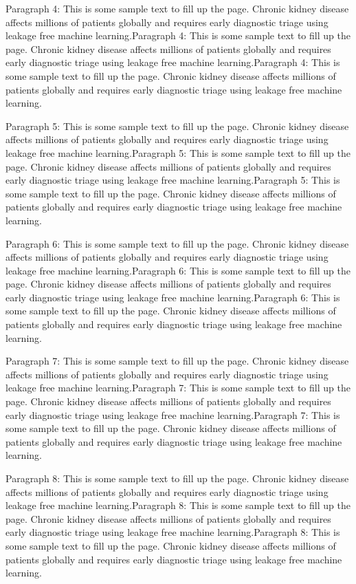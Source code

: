 \documentclass{IEEEtran}
\begin{document}
Paragraph 4: This is some sample text to fill up the page. Chronic kidney disease affects millions of patients globally and requires early diagnostic triage using leakage free machine learning.Paragraph 4: This is some sample text to fill up the page. Chronic kidney disease affects millions of patients globally and requires early diagnostic triage using leakage free machine learning.Paragraph 4: This is some sample text to fill up the page. Chronic kidney disease affects millions of patients globally and requires early diagnostic triage using leakage free machine learning.

Paragraph 5: This is some sample text to fill up the page. Chronic kidney disease affects millions of patients globally and requires early diagnostic triage using leakage free machine learning.Paragraph 5: This is some sample text to fill up the page. Chronic kidney disease affects millions of patients globally and requires early diagnostic triage using leakage free machine learning.Paragraph 5: This is some sample text to fill up the page. Chronic kidney disease affects millions of patients globally and requires early diagnostic triage using leakage free machine learning.

Paragraph 6: This is some sample text to fill up the page. Chronic kidney disease affects millions of patients globally and requires early diagnostic triage using leakage free machine learning.Paragraph 6: This is some sample text to fill up the page. Chronic kidney disease affects millions of patients globally and requires early diagnostic triage using leakage free machine learning.Paragraph 6: This is some sample text to fill up the page. Chronic kidney disease affects millions of patients globally and requires early diagnostic triage using leakage free machine learning.

Paragraph 7: This is some sample text to fill up the page. Chronic kidney disease affects millions of patients globally and requires early diagnostic triage using leakage free machine learning.Paragraph 7: This is some sample text to fill up the page. Chronic kidney disease affects millions of patients globally and requires early diagnostic triage using leakage free machine learning.Paragraph 7: This is some sample text to fill up the page. Chronic kidney disease affects millions of patients globally and requires early diagnostic triage using leakage free machine learning.

Paragraph 8: This is some sample text to fill up the page. Chronic kidney disease affects millions of patients globally and requires early diagnostic triage using leakage free machine learning.Paragraph 8: This is some sample text to fill up the page. Chronic kidney disease affects millions of patients globally and requires early diagnostic triage using leakage free machine learning.Paragraph 8: This is some sample text to fill up the page. Chronic kidney disease affects millions of patients globally and requires early diagnostic triage using leakage free machine learning.
\end{document}

